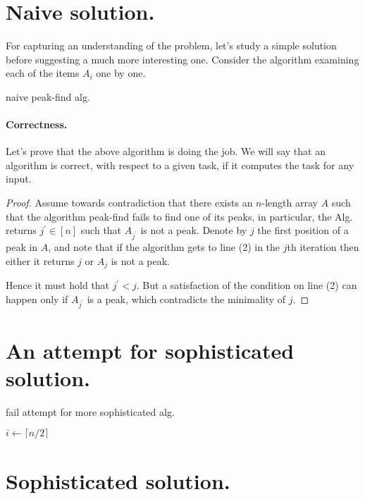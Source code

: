 \section{Naive solution.}
For capturing an understanding of the problem, let's study a simple solution before suggesting a much more interesting one. Consider the algorithm examining each of the items $A_{i}$ one by one.
\begin{algorithm}
\caption{naive peak-find alg.}
  { 
    } 
\end{algorithm}
\paragraph{Correctness.}
Let's prove that the above algorithm is doing the job. We will say that an algorithm is correct, with respect to a given task, if it computes the task for any input. 

\begin{proof}
  Assume towards contradiction that there exists an $n$-length array $A$ such that the algorithm peak-find fails to find one of its peaks, in particular, the Alg. returns $j^{\prime}\in [n]$ such that $A_{j^{\prime}}$ is not a peak. Denote by $j$ the first position of a peak in $A$, and note that if the algorithm gets to line (2) in the $j$th iteration then either it returns $j$ or $A_{j}$ is not a peak. 

  Hence it must hold that $j^{\prime} < j$. But a satisfaction of the condition on line (2) can happen only if $A_{j^{\prime}}$ is a peak, which contradicts the minimality of $j$.
\end{proof}


\section{An attempt for sophisticated solution.}
\begin{algorithm}
\caption{fail attempt for more sophisticated alg. }
        $ i \leftarrow  \lceil n/2 \rceil $\\
\end{algorithm}

\section{Sophisticated solution.}

